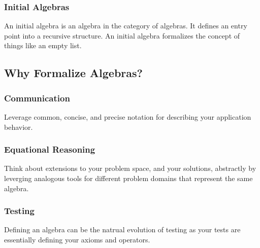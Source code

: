 \documentclass{beamer}
\begin{document}
\begin{frame}
  \frametitle{Initial Algebras}
  An initial algebra is an algebra in the category of algebras.  It
  defines an entry point into a recursive structure.  An initial
  algebra formalizes the concept of things like an empty list.
\end{frame}

\subsection{Why Formalize Algebras?}

\begin{frame}
  \frametitle{Communication}
  Leverage common, concise, and precise notation for describing your application behavior.
\end{frame}

\begin{frame}
  \frametitle{Equational Reasoning}
  Think about extensions to your problem space, and your solutions,
  abstractly by leverging analogous tools for different problem
  domains that represent the same algebra.
\end{frame}

\begin{frame}
  \frametitle{Testing}
  Defining an algebra can be the natrual evolution of testing as your
  tests are essentially defining your axioms and operators.
\end{frame}
\end{document}
